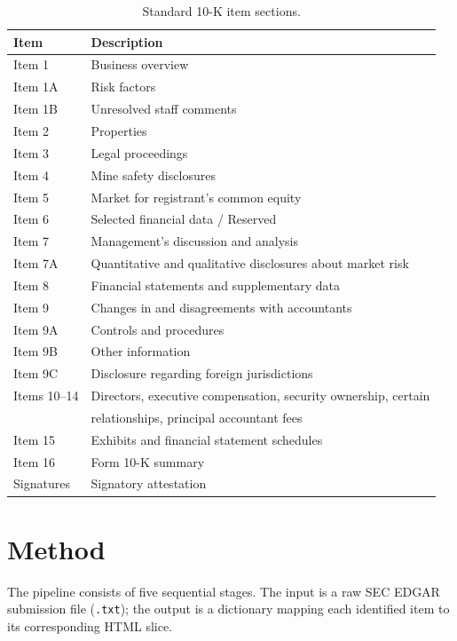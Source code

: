 \documentclass[11pt,a4paper]{article}
\begin{document}
\begin{table}[H]
\centering
\caption{Standard 10-K item sections.}
\label{tab:items}
\begin{tabular}{ll}
\toprule
\textbf{Item} & \textbf{Description}\\
\midrule
Item 1 & Business overview\\
Item 1A & Risk factors\\
Item 1B & Unresolved staff comments\\
Item 2 & Properties\\
Item 3 & Legal proceedings\\
Item 4 & Mine safety disclosures\\
Item 5 & Market for registrant's common equity\\
Item 6 & Selected financial data / Reserved\\
Item 7 & Management's discussion and analysis\\
Item 7A & Quantitative and qualitative disclosures about market risk\\
Item 8 & Financial statements and supplementary data\\
Item 9 & Changes in and disagreements with accountants\\
Item 9A & Controls and procedures\\
Item 9B & Other information\\
Item 9C & Disclosure regarding foreign jurisdictions\\
Items 10--14 & Directors, executive compensation, security ownership, certain\\
& relationships, principal accountant fees\\
Item 15 & Exhibits and financial statement schedules\\
Item 16 & Form 10-K summary\\
Signatures & Signatory attestation\\
\bottomrule
\end{tabular}
\end{table}


\section{Method}\label{sec:method}

The pipeline consists of five sequential stages. The input is a raw SEC EDGAR submission file (\texttt{.txt}); the output is a dictionary mapping each identified item to its corresponding HTML slice.
\end{document}
